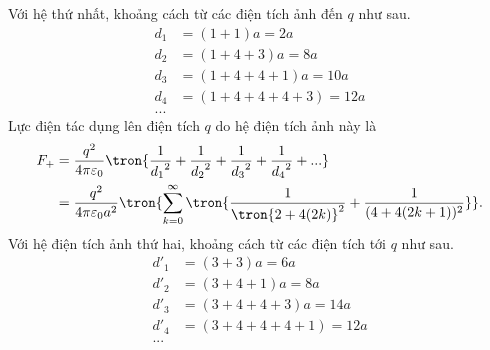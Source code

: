 \begin{loigiai}
\begin{center}

    \end{center}
    Với hệ thứ nhất, khoảng cách từ các điện tích ảnh đến $q$ như sau.
    \begin{equation*}
        \begin{aligned}
            d_1&=(1+1)a=2a\\
            d_2&=(1+4+3)a=8a\\
            d_3&=(1+4+4+1)a=10a\\
            d_4&=(1+4+4+4+3)=12a\\
            ...
        \end{aligned}
    \end{equation*}
    Lực điện tác dụng lên điện tích $q$ do hệ điện tích ảnh này là
    \begin{equation*}
    \begin{aligned}
         F_+&=\dfrac{q^2}{4\pi\varepsilon_0}\tron{\dfrac{1}{{d_1}^2}+\dfrac{1}{{d_2}^2}+\dfrac{1}{{d_3}^2}+\dfrac{1}{{d_4}^2}+...}\\
        &=\dfrac{q^2}{4\pi\varepsilon_0a^2}\tron{\sum_{k=0}^\infty\tron{\dfrac{1}{\tron{2+4(2k)}^2}+\dfrac{1}{(4+4(2k+1))^2}}}.
    \end{aligned}
    \end{equation*}
    Với hệ điện tích ảnh thứ hai, khoảng cách từ các điện tích tới $q$ như sau.
    \begin{equation*}
        \begin{aligned}
            d'_1&=(3+3)a=6a\\
            d'_2&=(3+4+1)a=8a\\
            d'_3&=(3+4+4+3)a=14a\\
            d'_4&=(3+4+4+4+1)=12a\\
            ... 
        \end{aligned}

\end{equation*}
\end{loigiai}
